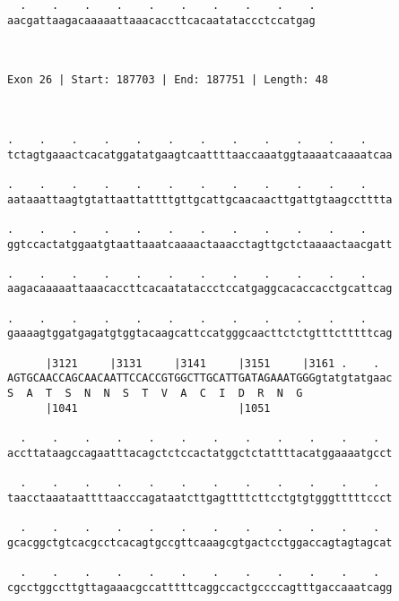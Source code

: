 \documentclass{article}
\begin{document}
\begin{Verbatim}
  .    .    .    .    .    .    .    .    .    .
aacgattaagacaaaaattaaacaccttcacaatataccctccatgag
                                                
                                                
 
Exon 26 | Start: 187703 | End: 187751 | Length: 48



.    .    .    .    .    .    .    .    .    .    .    .    
tctagtgaaactcacatggatatgaagtcaattttaaccaaatggtaaaatcaaaatcaa
                                                            
.    .    .    .    .    .    .    .    .    .    .    .    
aataaattaagtgtattaattattttgttgcattgcaacaacttgattgtaagcctttta
                                                            
.    .    .    .    .    .    .    .    .    .    .    .    
ggtccactatggaatgtaattaaatcaaaactaaacctagttgctctaaaactaacgatt
                                                            
.    .    .    .    .    .    .    .    .    .    .    .    
aagacaaaaattaaacaccttcacaatataccctccatgaggcacaccacctgcattcag
                                                            
.    .    .    .    .    .    .    .    .    .    .    .    
gaaaagtggatgagatgtggtacaagcattccatgggcaacttctctgtttctttttcag
                                                            
      |3121     |3131     |3141     |3151     |3161 .    .  
AGTGCAACCAGCAACAATTCCACCGTGGCTTGCATTGATAGAAATGGGgtatgtatgaac
S  A  T  S  N  N  S  T  V  A  C  I  D  R  N  G              
      |1041                         |1051                   
  
  .    .    .    .    .    .    .    .    .    .    .    .  
accttataagccagaatttacagctctccactatggctctattttacatggaaaatgcct
                                                            
  .    .    .    .    .    .    .    .    .    .    .    .  
taacctaaataattttaacccagataatcttgagttttcttcctgtgtgggtttttccct
                                                            
  .    .    .    .    .    .    .    .    .    .    .    .  
gcacggctgtcacgcctcacagtgccgttcaaagcgtgactcctggaccagtagtagcat
                                                            
  .    .    .    .    .    .    .    .    .    .    .    .  
cgcctggccttgttagaaacgccatttttcaggccactgccccagtttgaccaaatcagg
                                                            

\end{Verbatim}
\end{document}
